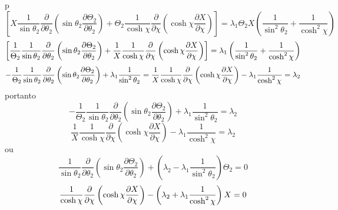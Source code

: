 \documentclass[a4paper,12pt]{article}
\begin{document}
p%
\begin{equation*}
\left[ X\frac{1}{\sin \theta _{2}}\frac{\partial }{\partial \theta _{2}}%
\left( \sin \theta _{2}\frac{\partial \Theta _{2}}{\partial \theta _{2}}%
\right) +\Theta _{2}\frac{1}{\cosh \chi }\frac{\partial }{\partial \chi }%
\left( \cosh \chi \frac{\partial X}{\partial \chi }\right) \right] =\lambda
_{1}\Theta _{2}X\left( \frac{1}{\sin ^{2}\theta _{2}}+\frac{1}{\cosh
^{2}\chi }\right)
\end{equation*}%
\begin{equation*}
\left[ \frac{1}{\Theta _{2}}\frac{1}{\sin \theta _{2}}\frac{\partial }{%
\partial \theta _{2}}\left( \sin \theta _{2}\frac{\partial \Theta _{2}}{%
\partial \theta _{2}}\right) +\frac{1}{X}\frac{1}{\cosh \chi }\frac{\partial 
}{\partial \chi }\left( \cosh \chi \frac{\partial X}{\partial \chi }\right) %
\right] =\lambda _{1}\left( \frac{1}{\sin ^{2}\theta _{2}}+\frac{1}{\cosh
^{2}\chi }\right)
\end{equation*}%
\begin{equation*}
-\frac{1}{\Theta _{2}}\frac{1}{\sin \theta _{2}}\frac{\partial }{\partial
\theta _{2}}\left( \sin \theta _{2}\frac{\partial \Theta _{2}}{\partial
\theta _{2}}\right) +\lambda _{1}\frac{1}{\sin ^{2}\theta _{2}}=\frac{1}{X}%
\frac{1}{\cosh \chi }\frac{\partial }{\partial \chi }\left( \cosh \chi \frac{%
\partial X}{\partial \chi }\right) -\lambda _{1}\frac{1}{\cosh ^{2}\chi }%
=\lambda _{2}
\end{equation*}%
portanto%
\begin{equation*}
-\frac{1}{\Theta _{2}}\frac{1}{\sin \theta _{2}}\frac{\partial }{\partial
\theta _{2}}\left( \sin \theta _{2}\frac{\partial \Theta _{2}}{\partial
\theta _{2}}\right) +\lambda _{1}\frac{1}{\sin ^{2}\theta _{2}}=\lambda _{2}
\end{equation*}%
\begin{equation*}
\frac{1}{X}\frac{1}{\cosh \chi }\frac{\partial }{\partial \chi }\left( \cosh
\chi \frac{\partial X}{\partial \chi }\right) -\lambda _{1}\frac{1}{\cosh
^{2}\chi }=\lambda _{2}
\end{equation*}%
ou%
\begin{equation*}
\frac{1}{\sin \theta _{2}}\frac{\partial }{\partial \theta _{2}}\left( \sin
\theta _{2}\frac{\partial \Theta _{2}}{\partial \theta _{2}}\right) +\left(
\lambda _{2}-\lambda _{1}\frac{1}{\sin ^{2}\theta _{2}}\right) \Theta _{2}=0
\end{equation*}%
\begin{equation*}
\frac{1}{\cosh \chi }\frac{\partial }{\partial \chi }\left( \cosh \chi \frac{%
\partial X}{\partial \chi }\right) -\left( \lambda _{2}+\lambda _{1}\frac{1}{%
\cosh ^{2}\chi }\right) X=0
\end{equation*}%
\end{document}
